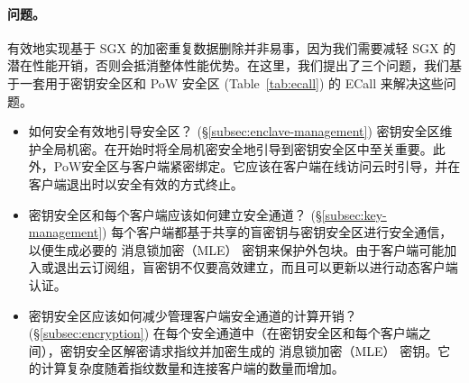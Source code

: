 \paragraph{问题。} 有效地​​实现基于 SGX 的加密重复数据删除并非易事，因为我们需要减轻 SGX 的潜在性能开销，否则会抵消整体性能优势。在这里，我们提出了三个问题，我们基于一套用于密钥安全区和 PoW 安全区 (Table~\ref{tab:ecall}) 的 ECall 来解决这些问题。

\begin{itemize}[leftmargin=*]
\item 如何安全有效地引导安全区？ (\S\ref{subsec:enclave-management})
  密钥安全区维护全局机密。在开始时将全局机密安全地引导到密钥安全区中至关重要。此外，PoW安全区与客户端紧密绑定。它应该在客户端在线访问云时引导，并在客户端退出时以安全有效的方式终止。
\item 密钥安全区和每个客户端应该如何建立安全通道？ (\S\ref{subsec:key-management})
  每个客户端都基于共享的盲密钥与密钥安全区进行安全通信，以便生成必要的 消息锁加密（MLE） 密钥来保护外包块。由于客户端可能加入或退出云订阅组，盲密钥不仅要高效建立，而且可以更新以进行动态客户端认证。
\item 密钥安全区应该如何减少管理客户端安全通道的计算开销？ (\S\ref{subsec:encryption})
  在每个安全通道中（在密钥安全区和每个客户端之间），密钥安全区解密请求指纹并加密生成的 消息锁加密（MLE） 密钥。它的计算复杂度随着指纹数量和连接客户端的数量而增加。
\end{itemize}
